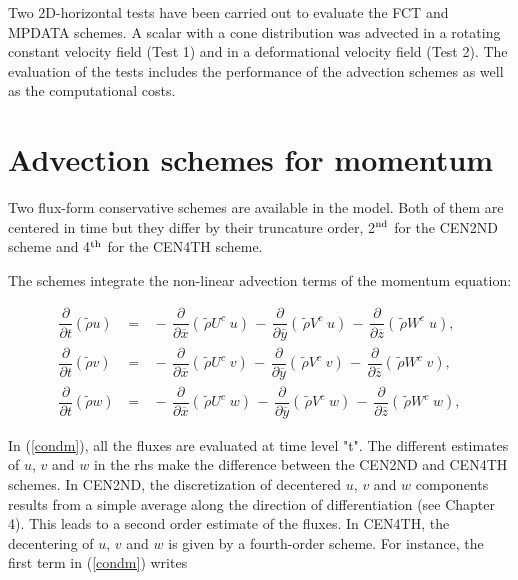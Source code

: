 Two 2D-horizontal tests have been carried out to evaluate the FCT and MPDATA
schemes. A scalar with a cone distribution was advected in a rotating 
constant velocity field (Test 1) and in a deformational velocity field 
(Test 2). The evaluation of the tests includes the
performance of the advection schemes as well as the computational costs.

\section{Advection schemes for momentum}

Two flux-form conservative schemes are available in the model. Both of them are centered in time but they differ by their truncature order, 2$^{\rm nd}$ for the CEN2ND scheme and 4$^{\rm th}$ for the CEN4TH scheme.

The schemes integrate the non-linear advection terms of the momentum equation:

\begin{eqnarray}
\label{condm}
\dfrac{\partial}{\partial t}(\tilde{\rho}u) \, &=&
 \, - \, \dfrac{\partial }{\partial \overline{x}} (\,\tilde{\rho} U^{c} \; u)
 \, - \, \dfrac{\partial }{\partial \overline{y}} (\,\tilde{\rho} V^{c} \; u)
 \, - \, \dfrac{\partial }{\partial \overline{z}} (\,\tilde{\rho} W^{c} \; u),\\
\dfrac{\partial}{\partial t}(\tilde{\rho}v) \, &=&
 \, - \, \dfrac{\partial }{\partial \overline{x}} (\,\tilde{\rho} U^{c} \; v)
 \, - \, \dfrac{\partial }{\partial \overline{y}} (\,\tilde{\rho} V^{c} \; v)
 \, - \, \dfrac{\partial }{\partial \overline{z}} (\,\tilde{\rho} W^{c} \; v),\\
\dfrac{\partial}{\partial t}(\tilde{\rho}w) \, &=&
 \, - \, \dfrac{\partial }{\partial \overline{x}} (\,\tilde{\rho} U^{c} \; w)
 \, - \, \dfrac{\partial }{\partial \overline{y}} (\,\tilde{\rho} V^{c} \; w)
 \, - \, \dfrac{\partial }{\partial \overline{z}} (\,\tilde{\rho} W^{c} \; w),
\end{eqnarray}

In (\ref{condm}), all the fluxes are evaluated at time level "t". The different estimates of $u$, $v$ and $w$ in the rhs make the difference between the CEN2ND and CEN4TH schemes. In CEN2ND, the discretization of decentered $u$, $v$ and $w$ components results from a simple average along the direction of differentiation (see Chapter 4). This leads to a second order estimate of the fluxes. In CEN4TH, the decentering of $u$, $v$ and $w$ is given by a fourth-order scheme. For instance, the first term in (\ref{condm}) writes

